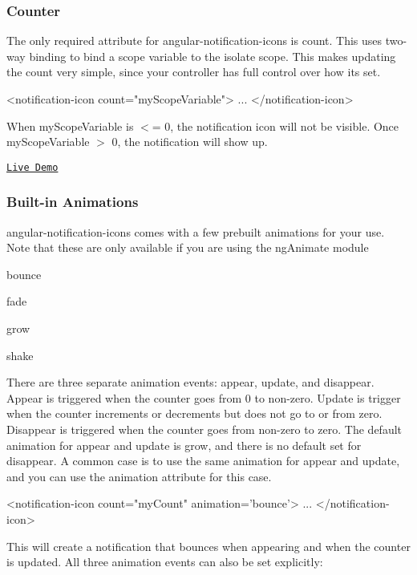 \subsubsection*{Counter}

The only required attribute for angular-\/notification-\/icons is \textquotesingle{}count\textquotesingle{}. This uses two-\/way binding to bind a scope variable to the isolate scope. This makes updating the count very simple, since your controller has full control over how it\textquotesingle{}s set. 
\begin{DoxyCode}
<notification-icon count="myScopeVariable">
    ...
</notification-icon>
\end{DoxyCode}
 When my\+Scope\+Variable is $<$= 0, the notification icon will not be visible. Once my\+Scope\+Variable $>$ 0, the notification will show up.

\href{http://jemonjam.com/angular-notification-icons#basic}{\tt Live Demo}

\subsubsection*{Built-\/in Animations}

angular-\/notification-\/icons comes with a few prebuilt animations for your use. Note that these are only available if you are using the ng\+Animate module


\begin{DoxyItemize}
\item bounce
\item fade
\item grow
\item shake
\end{DoxyItemize}

There are three separate animation events\+: appear, update, and disappear. Appear is triggered when the counter goes from 0 to non-\/zero. Update is trigger when the counter increments or decrements but does not go to or from zero. Disappear is triggered when the counter goes from non-\/zero to zero. The default animation for appear and update is grow, and there is no default set for disappear. A common case is to use the same animation for appear and update, and you can use the \textquotesingle{}animation\textquotesingle{} attribute for this case.


\begin{DoxyCode}
<notification-icon count="myCount" animation='bounce'>
    ...
</notification-icon>
\end{DoxyCode}
 This will create a notification that bounces when appearing and when the counter is updated. All three animation events can also be set explicitly\+:


